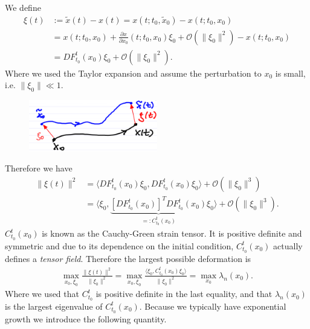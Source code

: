 \begin{ex}
	We define 
	\begin{subequations}	\begin{align}
		 {\xi}(t) &:= \tilde{ {x}}(t) -  {x}(t) =  {x}(t; t_0, \tilde{ {x}}_0) -  {x}(t; t_0,  {x}_0)\\
		       &=  {x}(t; t_0,  {x}_0) + \frac{\partial  {x}}{\partial  {x}_0}(t; t_0,  {x}_0) {\xi}_0 + \mathcal{O}( \| {\xi}_0 \|^2) -  {x}(t; t_0,  {x}_0) \\
		       &= DF_{t_0}^{t}( {x}_0) {\xi}_0 + \mathcal{O}( \| {\xi}_0 \|^2).
	\end{align}\end{subequations}
	Where we used the Taylor expansion and assume the perturbation to $ {x}_0$ is small, i.e. $ \| {\xi}_0 \| \ll 1$.
	\begin{figure}[h!]
		\centering
		\includegraphics[width=0.5\textwidth]{figures/ch1/8dispersion.png}
	\end{figure}
	Therefore we have
	\begin{subequations}	\begin{align}
		 \| {\xi}(t) \|^2 &= \langle DF_{t_0}^{t}( {x}_0)  {\xi}_0, DF_{t_0}^{t}( {x}_0) {\xi}_0 \rangle + \mathcal{O}( \| {\xi}_0 \|^3) \\
			   &= \langle  {\xi}_0, \underbrace{\left[ DF_{t_0}^{t}( {x}_0) \right]^T DF_{t_0}^{t}( {x}_0)}_{=: C_{t_0}^{t}( {x}_0)}  {\xi}_0 \rangle + \mathcal{O}( \| {\xi}_0 \|^3).
	\end{align}\end{subequations}
	$C_{t_0}^{t}( {x}_0)$ is known as the Cauchy-Green strain tensor. It is positive definite and symmetric and due to its dependence on the initial condition, $C_{t_0}^{t}(x_0)$ actually defines a \emph{tensor field}.
	Therefore the largest possible deformation is
	\begin{align}
		\max_{ {x}_0, {\xi}_0} \frac{ \| {\xi}(t) \|^2}{ \| {\xi}_0 \|^2} = \max_{ {x}_0,  {\xi}_0}\frac{\langle  {\xi}_0, C_{t_0}^{t}( {x}_0)  {\xi}_0 \rangle}{ \| {\xi}_0 \|^2} = \max_{ {x}_0} \lambda_{n}( {x}_0).
	\end{align}
	Where we used that $C_{t_0}^{t}$ is positive definite in the last equality, and that $\lambda_n( {x}_0)$ is the largest eigenvalue of $C_{t_0}^{t}( {x}_0)$. Because we typically have exponential growth we introduce the following quantity.	
\end{ex}
